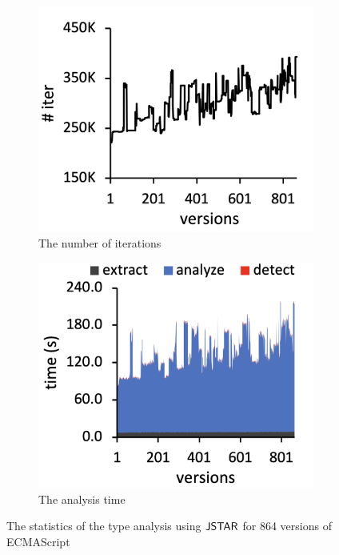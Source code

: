 \begin{figure}
\begin{subfigure}[b]{0.24\textwidth}
    \includegraphics[width=\textwidth]{img/iter}
    \caption{The number of iterations}
  \end{subfigure}
  \begin{subfigure}[b]{0.24\textwidth}
    \includegraphics[width=\textwidth]{img/time}
    \caption{The analysis time}
  \end{subfigure}
  \caption{The statistics of the type analysis using $\tool$ for 864 versions of
  ECMAScript}
  \vspace*{-1em}
  \label{fig:stat}
\end{figure}


